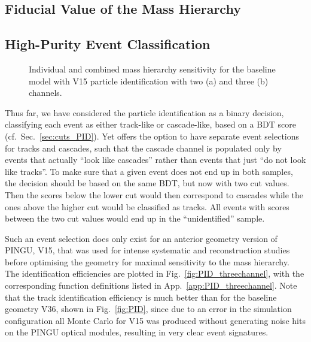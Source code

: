 \subsection{Fiducial Value of the Mass Hierarchy}
\label{sec:results_NHtrue}

\subsection{High-Purity Event Classification}
\label{sec:results_includeunkn}

\begin{figure}[thp]
 \centering
 \caption{Individual and combined mass hierarchy sensitivity for the
   baseline model with V15 particle identification with two (a) and three
   (b) channels.}
 \label{fig:sigma_vs_t_HQPID}
\end{figure}

Thus far, we have considered the particle identification as a binary decision, 
classifying each event as either track-like or cascade-like, based on a BDT 
score (cf.\ Sec.~\ref{sec:cuts_PID}). Yet \papa offers the option to have 
separate event selections for tracks and cascades, such that \eg the cascade 
channel is populated only by events that actually ``look like cascades'' rather 
than events that just ``do not look like tracks''. To make sure that a given 
event does not end up in both samples, the decision should be based on the same 
BDT, but now with two cut values. Then the scores below the lower cut would 
then \eg correspond to cascades while the ones above the higher cut would be 
classified as tracks. All events with scores between the two cut values would 
end up in the ``unidentified'' sample.

Such an event selection does only exist for an anterior geometry version of 
PINGU, V15, that was used for intense systematic and reconstruction studies 
before optimising the geometry for maximal sensitivity to the mass hierarchy. 
The identification efficiencies are plotted in Fig.~\ref{fig:PID_threechannel}, 
with the corresponding function definitions listed in 
App.~\ref{app:PID_threechannel}. Note that the track identification efficiency 
is much better than for the baseline geometry V36, shown in Fig.~\ref{fig:PID}, 
since due to an error in the simulation configuration all Monte Carlo for V15 
was produced without generating noise hits on the PINGU optical modules, 
resulting in very clear event signatures.

